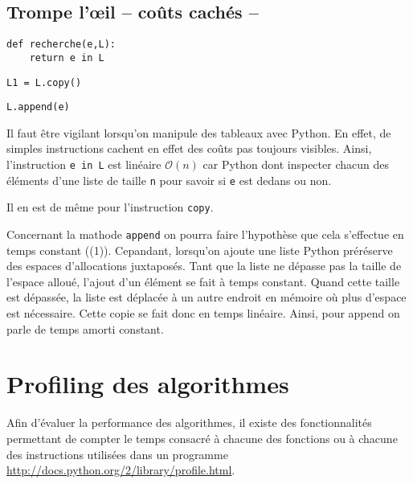 \subsection{Trompe l'\oe il -- coûts cachés --}
\begin{minipage}[t]{.31\linewidth}
\begin{lstlisting}
def recherche(e,L):
    return e in L
\end{lstlisting}
\end{minipage} \hfill
\begin{minipage}[t]{.31\linewidth}
\begin{lstlisting}
L1 = L.copy()
\end{lstlisting}
\end{minipage} \hfill
\begin{minipage}[t]{.31\linewidth}
\begin{lstlisting}
L.append(e)
\end{lstlisting}
\end{minipage} 

Il faut être vigilant lorsqu'on manipule des tableaux avec Python. En effet, de simples instructions cachent en effet des coûts pas toujours visibles. 
Ainsi, l'instruction \texttt{e in L} est linéaire $\mathcal{O}(n)$ car Python dont inspecter chacun des éléments d'une liste de taille \texttt{n} pour savoir si \texttt{e} est dedans ou non.

Il en est de même pour l'instruction \texttt{copy}. 

Concernant la mathode \texttt{append} on pourra faire l'hypothèse que cela s'effectue en temps constant ((1)). Cepandant, lorsqu'on ajoute une liste Python préréserve des espaces d'allocations juxtaposés. Tant que la liste ne dépasse pas la taille de l'espace alloué, l'ajout d'un élément se fait à temps constant. Quand cette taille est dépassée, la liste est déplacée à un autre endroit en mémoire où plus d'espace est nécessaire. Cette copie se fait donc en temps linéaire. Ainsi, pour append on parle de temps amorti constant.

\section{Profiling des algorithmes}

Afin d'évaluer la performance des algorithmes, il existe des fonctionnalités permettant de compter le temps consacré à chacune des fonctions ou à chacune des instructions utilisées dans un programme \url{http://docs.python.org/2/library/profile.html}.

